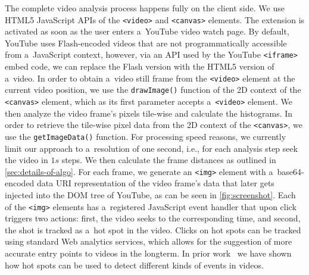 \documentclass{sig-alternate}
\begin{document}
The complete video analysis process happens fully on the client side. We use HTML5 JavaScript APIs of the \texttt{<video>} and \texttt{<canvas>} elements. The extension is activated as soon as the user enters a~YouTube video watch page. By default, YouTube uses Flash-encoded videos that are not programmatically accessible from a~JavaScript context, however, via an API used by the YouTube \texttt{<iframe>} embed code, we can replace the Flash version with the HTML5 version of a~video. In order to obtain a~video still frame from the \texttt{<video>} element at the current video position, we use the \texttt{drawImage()} function of the 2D context of the \texttt{<canvas>} element, which as its first parameter accepts a~\texttt{<video>} element. We then analyze the video frame's pixels tile-wise and calculate the histograms. In order to retrieve the tile-wise pixel data from the 2D context of the \texttt{<canvas>}, we use the \texttt{getImageData()} function. For processing speed reasons, we currently limit our approach to a~resolution of one second, i.e., for each analysis step seek the video in $\mathit{1s}$ steps. We then calculate the frame distances as outlined in \autoref{sec:details-of-algo}. For each frame, we generate an \texttt{<img>} element with a~base64-encoded data URI representation of the video frame's data that later gets injected into the DOM tree of YouTube, as can be seen in \autoref{fig:screenshot}. Each of the \texttt{<img>} elements has a~registered JavaScript event handler that upon click triggers two actions: first, the video seeks to the corresponding time, and second, the shot is tracked as a~hot spot in the video. Clicks on hot spots can be tracked using standard Web analytics services, which allows for the suggestion of more accurate entry points to videos in the longterm. 
In prior work~\cite{derive2011} we have shown how hot spots can be used to detect different kinds of events in videos.
\end{document}
